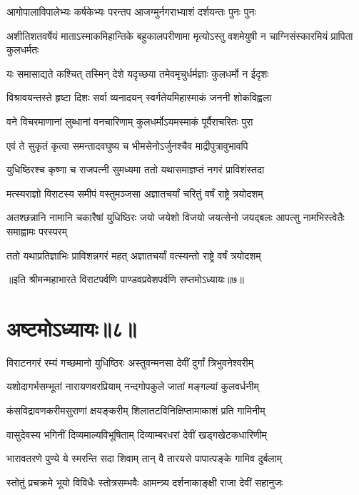 \twolineshloka
{आगोपालाविपालेभ्यः कर्षकेभ्यः परन्तप}
{आजग्मुर्नगराभ्याशं दर्शयन्तः पुनः पुनः}


\threelineshloka
{अशीतिशतवर्षेयं माताऽस्माकमिहान्तिके}
{बहुकालपरीणामा मृत्योऽस्तु वशमेयुषी}
{न चाग्निसंस्कारमियं प्रापिता कुलधर्मतः}


\twolineshloka
{यः समासाद्यते कश्चित् तस्मिन् देशे यदृच्छया}
{तमेवमृचुर्धर्मज्ञाः कुलधर्मो न ईदृशः}


\twolineshloka
{विश्रावयन्तस्ते हृष्टा दिशः सर्वा व्यनादयन्}
{स्वर्गतेयमिहास्माकं जननी शोकविह्वला}


\twolineshloka
{वने विचरमाणानां लुब्धानां वनचारिणाम्}
{कुलधर्मोऽयमस्माकं पूर्वैराचरितः पुरा}


\twolineshloka
{एवं ते सुकृतं कृत्वा समन्तादवघुष्य च}
{भीमसेनोऽर्जुनश्चैव माद्रीपुत्रावुभावपि}


\twolineshloka
{युधिष्ठिरश्च कृष्णा च राजपत्नी सुमध्यमा}
{ततो यथासमाज्ञप्तं नगरं प्राविशंस्तदा}


\twolineshloka
{मत्स्यराज्ञो विराटस्य समीपं वस्तुमञ्जसा}
{अज्ञातचर्यां चरितुं वर्षं राष्ट्रे त्रयोदशम्}


\threelineshloka
{अतश्छन्नानि नामानि चकारैषां युधिष्ठिरः}
{जयो जयेशो विजयो जयत्सेनो जयद्बलः}
{आपत्सु नामभिस्त्वेतैः समाह्वामः परस्परम्}


\twolineshloka
{ततो यथाप्रतिज्ञाभिः प्राविशन्नगरं महत्}
{अज्ञातचर्यां वत्स्यन्तो राष्ट्रे वर्षं त्रयोदशम्}

॥इति श्रीमन्महाभारते विराटपर्वणि पाण्डवप्रवेशपर्वणि सप्तमोऽध्यायः॥७॥

\chapter{अष्टमोऽध्यायः॥८॥}

\twolineshloka
{विराटनगरं रम्यं गच्छमानो युधिष्ठिरः}
{अस्तुवन्मनसा देवीं दुर्गां त्रिभुवनेश्वरीम्}


\twolineshloka
{यशोदागर्भसम्भूतां नारायणवरप्रियाम्}
{नन्दगोपकुले जातां मङ्गल्यां कुलवर्धनीम्}


\twolineshloka
{कंसविद्रावणकरीमसुराणां क्षयङ्करीम्}
{शिलातटविनिक्षिप्तामाकाशं प्रति गामिनीम्}


\twolineshloka
{वासुदेवस्य भगिनीं दिव्यमाल्यविभूषिताम्}
{दिव्याम्बरधरां देवीं खड्गखेटकधारिणीम्}


\twolineshloka
{भारावतरणे पुण्ये ये स्मरन्ति सदा शिवाम्}
{तान् वै तारयसे पापात्पङ्के गामिव दुर्बलाम्}


\twolineshloka
{स्तोतुं प्रचक्रमे भूयो विविधैः स्तोत्रसम्भवैः}
{आमन्त्र्य दर्शनाकाङ्क्षी राजा देवीं सहानुजः}


